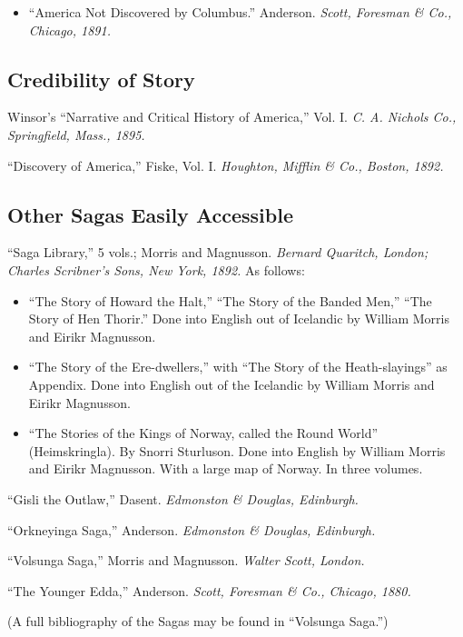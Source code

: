 \begin{itemize}
\item ``America Not Discovered by Columbus.'' Anderson. \emph{Scott, Foresman \&
Co., Chicago, 1891.}
\end{itemize}

\subsection*{Credibility of Story}

Winsor's ``Narrative and Critical History of America,'' Vol. I. \emph{C.
A. Nichols Co., Springfield, Mass., 1895.}

\noindent ``Discovery of America,'' Fiske, Vol. I. \emph{Houghton,
Mifflin \& Co., Boston, 1892.}

\subsection*{Other Sagas Easily Accessible}

``Saga Library,'' 5 vols.; Morris and Magnusson. \emph{Bernard Quaritch,
London; Charles Scribner's Sons, New York, 1892.} As follows:

\begin{itemize}[itemsep=0pt]
\item ``The Story of Howard the Halt,'' ``The Story of the Banded Men,'' ``The
Story of Hen Thorir.'' Done into English out of Icelandic by William
Morris and Eirikr Magnusson.
\item ``The Story of the Ere-dwellers,'' with ``The Story of the
Heath-slayings'' as Appendix. Done into English out of the Icelandic
by William Morris and Eirikr Magnusson.
\item ``The Stories of the Kings of Norway, called the Round World''
(Heimskringla). By Snorri Sturluson. Done into English by William
Morris and Eirikr Magnusson. With a large map of Norway. In three
volumes.
\end{itemize}

\noindent ``Gisli the Outlaw,'' Dasent. \emph{Edmonston \& Douglas,
Edinburgh.}

\noindent ``Orkneyinga Saga,'' Anderson. \emph{Edmonston \& Douglas,
Edinburgh.}

\noindent ``Volsunga Saga,'' Morris and Magnusson. \emph{Walter Scott,
London.}

\noindent ``The Younger Edda,'' Anderson. \emph{Scott, Foresman \& Co.,
Chicago, 1880.}

\noindent (A full bibliography of the Sagas may be found in ``Volsunga
Saga.'')

